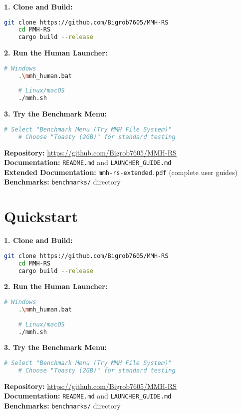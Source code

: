 \documentclass[11pt,a4paper]{article}
\begin{document}
	\begin{calloutbox}
	\textbf{1. Clone and Build:}
	\begin{lstlisting}[language=bash]
	git clone https://github.com/Bigrob7605/MMH-RS
	cd MMH-RS
	cargo build --release
	\end{lstlisting}

	\textbf{2. Run the Human Launcher:}
	\begin{lstlisting}[language=bash]
	# Windows
	.\mmh_human.bat
	
	# Linux/macOS
	./mmh.sh
	\end{lstlisting}

	\textbf{3. Try the Benchmark Menu:}
	\begin{lstlisting}[language=bash]
	# Select "Benchmark Menu (Try MMH File System)"
	# Choose "Toasty (2GB)" for standard testing
	\end{lstlisting}

	\textbf{Repository:} \url{https://github.com/Bigrob7605/MMH-RS} \\
	\textbf{Documentation:} \texttt{README.md} and \texttt{LAUNCHER\_GUIDE.md} \\
	\textbf{Extended Documentation:} \texttt{mmh-rs-extended.pdf} (complete user guides) \\
	\textbf{Benchmarks:} \texttt{benchmarks/} directory
	\end{calloutbox}
	
	\tableofcontents
	\newpage
	
	\section*{Quickstart}
	
	\begin{calloutbox}
	\textbf{1. Clone and Build:}
	\begin{lstlisting}[language=bash]
	git clone https://github.com/Bigrob7605/MMH-RS
	cd MMH-RS
	cargo build --release
	\end{lstlisting}
	
	\textbf{2. Run the Human Launcher:}
	\begin{lstlisting}[language=bash]
	# Windows
	.\mmh_human.bat
	
	# Linux/macOS
	./mmh.sh
	\end{lstlisting}
	
	\textbf{3. Try the Benchmark Menu:}
	\begin{lstlisting}[language=bash]
	# Select "Benchmark Menu (Try MMH File System)"
	# Choose "Toasty (2GB)" for standard testing
	\end{lstlisting}
	
	\textbf{Repository:} \url{https://github.com/Bigrob7605/MMH-RS} \\
	\textbf{Documentation:} \texttt{README.md} and \texttt{LAUNCHER\_GUIDE.md} \\
	\textbf{Benchmarks:} \texttt{benchmarks/} directory
	\end{calloutbox}
	
\end{document}
